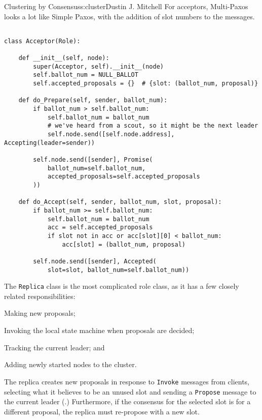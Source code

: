 \begin{aosachapter}{Clustering by Consensus}{s:cluster}{Dustin J. Mitchell}
For acceptors, Multi-Paxos looks a lot like Simple Paxos, with the
addition of slot numbers to the messages.

\begin{verbatim}

class Acceptor(Role):

    def __init__(self, node):
        super(Acceptor, self).__init__(node)
        self.ballot_num = NULL_BALLOT
        self.accepted_proposals = {}  # {slot: (ballot_num, proposal)}

    def do_Prepare(self, sender, ballot_num):
        if ballot_num > self.ballot_num:
            self.ballot_num = ballot_num
            # we've heard from a scout, so it might be the next leader
            self.node.send([self.node.address], Accepting(leader=sender))

        self.node.send([sender], Promise(
            ballot_num=self.ballot_num, 
            accepted_proposals=self.accepted_proposals
        ))

    def do_Accept(self, sender, ballot_num, slot, proposal):
        if ballot_num >= self.ballot_num:
            self.ballot_num = ballot_num
            acc = self.accepted_proposals
            if slot not in acc or acc[slot][0] < ballot_num:
                acc[slot] = (ballot_num, proposal)

        self.node.send([sender], Accepted(
            slot=slot, ballot_num=self.ballot_num))
\end{verbatim}

\label{replica}

The \texttt{Replica} class is the most complicated role class, as it has
a few closely related responsibilities:

\begin{aosaitemize}

\item
  Making new proposals;
\item
  Invoking the local state machine when proposals are decided;
\item
  Tracking the current leader; and
\item
  Adding newly started nodes to the cluster.
\end{aosaitemize}

The replica creates new proposals in response to \texttt{Invoke}
messages from clients, selecting what it believes to be an unused slot
and sending a \texttt{Propose} message to the current leader
(.) Furthermore, if the consensus for
the selected slot is for a different proposal, the replica must
re-propose with a new slot.


\end{aosachapter}
